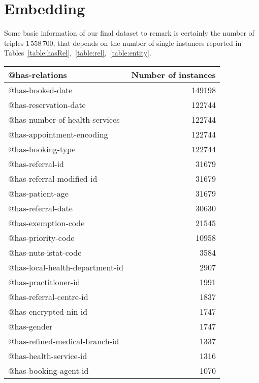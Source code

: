 \documentclass{article}
\begin{document}
\section{Embedding}
Some basic information of our final dataset to remark is certainly the number of triples $1\,558\,700$, that depends on the number of single instances reported in Tables~\ref{table:hasRel},~\ref{table:rel},~\ref{table:entity}. %
\begin{table}[]
\centering
\begin{tabular}{lr}
\toprule
                   @has-relations &  Number of instances \\
\midrule
                 @has-booked-date &             149198 \\
            @has-reservation-date &             122744 \\
   @has-number-of-health-services &             122744 \\
        @has-appointment-encoding &             122744 \\
                @has-booking-type &             122744 \\
                 @has-referral-id &              31679 \\
        @has-referral-modified-id &              31679 \\
                 @has-patient-age &              31679 \\
               @has-referral-date &              30630 \\
              @has-exemption-code &              21545 \\
               @has-priority-code &              10958 \\
             @has-nuts-istat-code &               3584 \\
  @has-local-health-department-id &               2907 \\
             @has-practitioner-id &               1991 \\
          @has-referral-centre-id &               1837 \\
            @has-encrypted-nin-id &               1747 \\
                      @has-gender &               1747 \\
   @has-refined-medical-branch-id &               1337 \\
           @has-health-service-id &               1316 \\
            @has-booking-agent-id &               1070 \\

\end{tabular}
\end{table}
\end{document}
